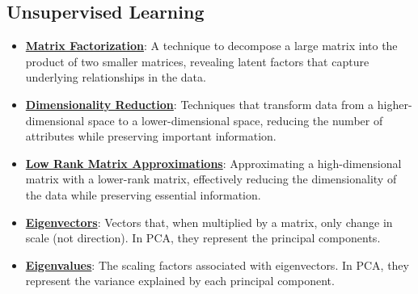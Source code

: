 \documentclass{article}%
\begin{document}
%
\subsection{Unsupervised Learning}%
\label{subsec:UnsupervisedLearning}%
\begin{itemize}[leftmargin=*]%
\item \href{https://purdue.brightspace.com/d2l/common/assets/pdfjs-d2l-dist/1.0.14-legacy/web/viewer.html?file=\%2Fcontent\%2Fenforced\%2F1095467-wl.202510.CS.24300.001\%2F11L2-svd-pca-recommender.pdf\%3Fou\%3D1095467\&lang=en-us\&container=d2l-fileviewer-rendered-pdf\&fullscreen=d2l-fileviewer-rendered-pdf-dialog\&height=667#page=2}{\textbf{Matrix Factorization}}: A technique to decompose a large matrix into the product of two smaller matrices, revealing latent factors that capture underlying relationships in the data.%
\item \href{https://purdue.brightspace.com/d2l/common/assets/pdfjs-d2l-dist/1.0.14-legacy/web/viewer.html?file=\%2Fcontent\%2Fenforced\%2F1095467-wl.202510.CS.24300.001\%2F11L2-svd-pca-recommender.pdf\%3Fou\%3D1095467\&lang=en-us\&container=d2l-fileviewer-rendered-pdf\&fullscreen=d2l-fileviewer-rendered-pdf-dialog\&height=667#page=8}{\textbf{Dimensionality Reduction}}: Techniques that transform data from a higher-dimensional space to a lower-dimensional space, reducing the number of attributes while preserving important information.%
\item \href{https://purdue.brightspace.com/d2l/common/assets/pdfjs-d2l-dist/1.0.14-legacy/web/viewer.html?file=\%2Fcontent\%2Fenforced\%2F1095467-wl.202510.CS.24300.001\%2F11L2-svd-pca-recommender.pdf\%3Fou\%3D1095467\&lang=en-us\&container=d2l-fileviewer-rendered-pdf\&fullscreen=d2l-fileviewer-rendered-pdf-dialog\&height=667#page=9}{\textbf{Low Rank Matrix Approximations}}: Approximating a high-dimensional matrix with a lower-rank matrix, effectively reducing the dimensionality of the data while preserving essential information.%
\item \href{https://purdue.brightspace.com/d2l/common/assets/pdfjs-d2l-dist/1.0.14-legacy/web/viewer.html?file=\%2Fcontent\%2Fenforced\%2F1095467-wl.202510.CS.24300.001\%2F11L2-svd-pca-recommender.pdf\%3Fou\%3D1095467\&lang=en-us\&container=d2l-fileviewer-rendered-pdf\&fullscreen=d2l-fileviewer-rendered-pdf-dialog\&height=667#page=17}{\textbf{Eigenvectors}}: Vectors that, when multiplied by a matrix, only change in scale (not direction). In PCA, they represent the principal components.%
\item \href{https://purdue.brightspace.com/d2l/common/assets/pdfjs-d2l-dist/1.0.14-legacy/web/viewer.html?file=\%2Fcontent\%2Fenforced\%2F1095467-wl.202510.CS.24300.001\%2F11L2-svd-pca-recommender.pdf\%3Fou\%3D1095467\&lang=en-us\&container=d2l-fileviewer-rendered-pdf\&fullscreen=d2l-fileviewer-rendered-pdf-dialog\&height=667#page=17}{\textbf{Eigenvalues}}: The scaling factors associated with eigenvectors. In PCA, they represent the variance explained by each principal component.%

\end{itemize}
\end{document}
